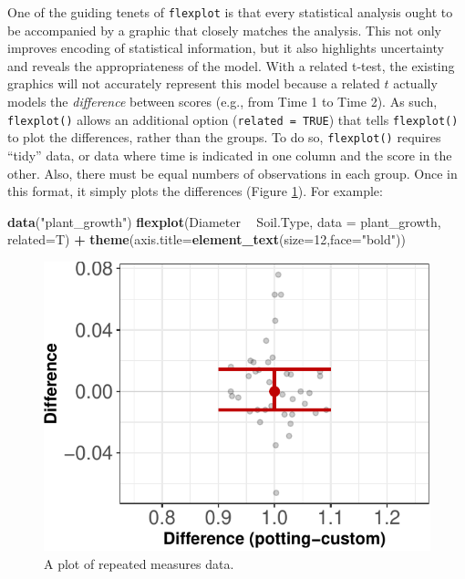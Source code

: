 \documentclass[
  man]{apa6}
\newenvironment{Shaded}{\begin{snugshade}}{\end{snugshade}}
\newcommand{\DataTypeTok}[1]{\textcolor[rgb]{0.13,0.29,0.53}{#1}}
\newcommand{\DecValTok}[1]{\textcolor[rgb]{0.00,0.00,0.81}{#1}}
\newcommand{\KeywordTok}[1]{\textcolor[rgb]{0.13,0.29,0.53}{\textbf{#1}}}
\newcommand{\NormalTok}[1]{#1}
\newcommand{\OperatorTok}[1]{\textcolor[rgb]{0.81,0.36,0.00}{\textbf{#1}}}
\newcommand{\StringTok}[1]{\textcolor[rgb]{0.31,0.60,0.02}{#1}}
\begin{document}
One of the guiding tenets of \texttt{flexplot} is that every statistical analysis ought to be accompanied by a graphic that closely matches the analysis. This not only improves encoding of statistical information, but it also highlights uncertainty and reveals the appropriateness of the model. With a related t-test, the existing graphics will not accurately represent this model because a related \(t\) actually models the \emph{difference} between scores (e.g., from Time 1 to Time 2). As such, \texttt{flexplot()} allows an additional option (\texttt{related\ =\ TRUE}) that tells \texttt{flexplot()} to plot the differences, rather than the groups. To do so, \texttt{flexplot()} requires \enquote{tidy} data, or data where time is indicated in one column and the score in the other. Also, there must be equal numbers of observations in each group. Once in this format, it simply plots the differences (Figure \ref{fig:plant}). For example:

\begin{Shaded}
\begin{Highlighting}[]
\KeywordTok{data}\NormalTok{(}\StringTok{"plant_growth"}\NormalTok{)}
\KeywordTok{flexplot}\NormalTok{(Diameter }\OperatorTok{~}\StringTok{ }\NormalTok{Soil.Type, }\DataTypeTok{data =}\NormalTok{ plant_growth, }\DataTypeTok{related=}\NormalTok{T) }\OperatorTok{+}
\StringTok{  }\KeywordTok{theme}\NormalTok{(}\DataTypeTok{axis.title=}\KeywordTok{element_text}\NormalTok{(}\DataTypeTok{size=}\DecValTok{12}\NormalTok{,}\DataTypeTok{face=}\StringTok{"bold"}\NormalTok{))}
\end{Highlighting}
\end{Shaded}

\begin{figure}
\centering
\includegraphics{flexplot_psychmeth_files/figure-latex/plant-1.pdf}
\caption{\label{fig:plant}A plot of repeated measures data.\label{fig:plant}}
\end{figure}
\end{document}
